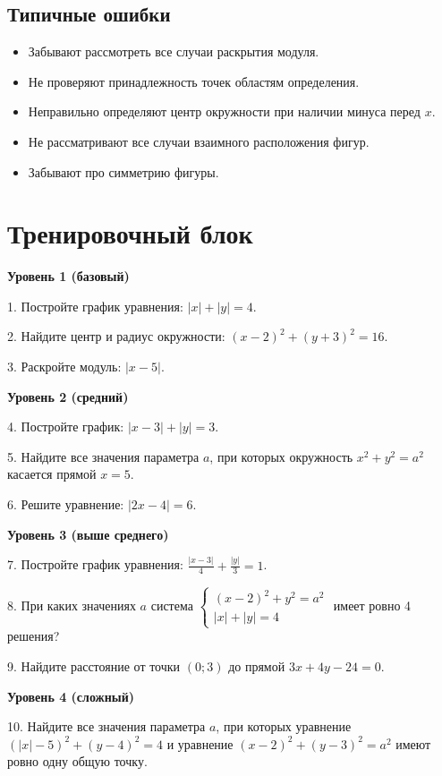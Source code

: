 \documentclass[a4paper,12pt]{article}
\begin{document}
\subsection*{Типичные ошибки}
\begin{itemize}[leftmargin=*]
\item[$\times$] Забывают рассмотреть все случаи раскрытия модуля.
\item[$\times$] Не проверяют принадлежность точек областям определения.
\item[$\times$] Неправильно определяют центр окружности при наличии минуса перед $x$.
\item[$\times$] Не рассматривают все случаи взаимного расположения фигур.
\item[$\times$] Забывают про симметрию фигуры.
\end{itemize}

\newpage
\section*{Тренировочный блок}

\textbf{Уровень 1 (базовый)}

1. Постройте график уравнения: $|x| + |y| = 4$.

2. Найдите центр и радиус окружности: $(x-2)^2 + (y+3)^2 = 16$.

3. Раскройте модуль: $|x-5|$.

\medskip
\textbf{Уровень 2 (средний)}

4. Постройте график: $|x-3| + |y| = 3$.

5. Найдите все значения параметра $a$, при которых окружность $x^2 + y^2 = a^2$ касается прямой $x = 5$.

6. Решите уравнение: $|2x - 4| = 6$.

\medskip
\textbf{Уровень 3 (выше среднего)}

7. Постройте график уравнения: $\frac{|x-3|}{4} + \frac{|y|}{3} = 1$.

8. При каких значениях $a$ система $\begin{cases} (x-2)^2 + y^2 = a^2 \\ |x| + |y| = 4 \end{cases}$ имеет ровно 4 решения?

9. Найдите расстояние от точки $(0;3)$ до прямой $3x + 4y - 24 = 0$.

\medskip
\textbf{Уровень 4 (сложный)}

10. Найдите все значения параметра $a$, при которых уравнение $(|x|-5)^2 + (y-4)^2 = 4$ и уравнение $(x-2)^2 + (y-3)^2 = a^2$ имеют ровно одну общую точку.
\end{document}
